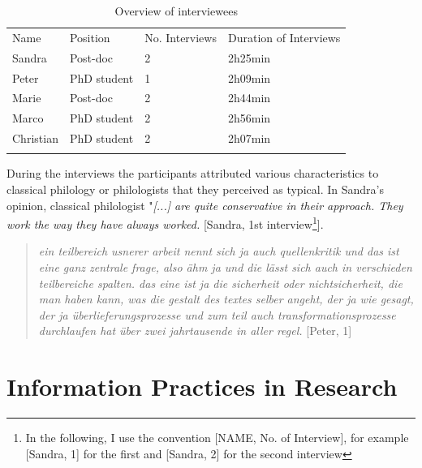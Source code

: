 \documentclass[12pt,a4paper,titlepage,oneside,abstract=true,toc=listof,toc=bibliography]{scrreprt}
\begin{document}
\small
\begin{table}
\caption{Overview of interviewees}
\label{tab:interviewees}
\centering
\begin{tabular}{llll}
& & & \\
\hline
Name & Position & No. Interviews & Duration of Interviews\\
\hline
\hline
Sandra & Post-doc & 2 & 2h25min\\
Peter & PhD student & 1 & 2h09min\\
Marie & Post-doc & 2 & 2h44min\\
Marco & PhD student & 2 & 2h56min\\
Christian & PhD student & 2 & 2h07min\\
\hline
& & & \\
\end{tabular}
\end{table}
\normalsize

During the interviews the participants attributed various characteristics to classical philology or philologists that they perceived as typical. %
In Sandra's opinion, classical philologist "\textit{[...] are quite conservative in their approach. They work the way they have always worked.} [Sandra, 1st interview\footnote{In the following, I use the convention [NAME, No. of Interview], for example [Sandra, 1] for the first and [Sandra, 2] for the second interview}]. 




\begin{quotation}
\textit{ein teilbereich usnerer arbeit nennt sich ja auch quellenkritik und das ist eine ganz zentrale frage, also ähm ja und die lässt sich auch in verschieden teilbereiche spalten. das eine ist ja die sicherheit oder nichtsicherheit, die man haben kann, was die gestalt des textes selber angeht, der ja wie gesagt, der ja überlieferungsprozesse und zum teil auch transformationsprozesse durchlaufen hat über zwei jahrtausende in aller regel. } [Peter, 1]
\end{quotation}





\section{Information Practices in Research}
\end{document}
